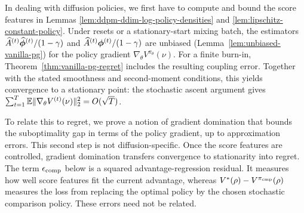 
In dealing with diffusion policies, we first have to compute and bound the score features in Lemmas \ref{lem:ddpm-ddim-log-policy-densities} and \ref{lem:lipschitz-constant-policy}. Under resets or a stationary-start mixing batch, the estimators $\widehat A^{(t)}\widehat{\boldsymbol{\phi}}^{(t)}/(1-\gamma)$ and $\widehat A^{(t)}\boldsymbol{\phi}^{(t)}/(1-\gamma)$ are unbiased (Lemma~\ref{lem:unbiased-vanilla-pg}) for the policy gradient $\nabla_\theta V^{\pi_\theta}(\nu)$. For a finite burn-in, Theorem~\ref{thm:vanilla-pg-regret} includes the resulting coupling error. Together with the stated smoothness and second-moment conditions, this yields convergence to a stationary point: the stochastic ascent argument \citep{yuan22vanillapg} gives $\sum_{t=1}^T\mathbb{E}\|\nabla_\theta V^{(t)}(\nu)\|_2^2=O(\sqrt T)$. 



To relate this to regret, we prove a notion of gradient domination that bounds the suboptimality gap in terms of the policy gradient, up to approximation errors. This second step is not diffusion-specific. Once the score features are controlled, gradient domination transfers convergence to stationarity into regret. The term $\epsilon_{\rm comp}$ below is a squared advantage-regression residual. It measures how well score features fit the current advantage, whereas $V^*(\rho)-V^{\pi_{\rm cmp}}(\rho)$ measures the loss from replacing the optimal policy by the chosen stochastic comparison policy. These errors need not be related. 

